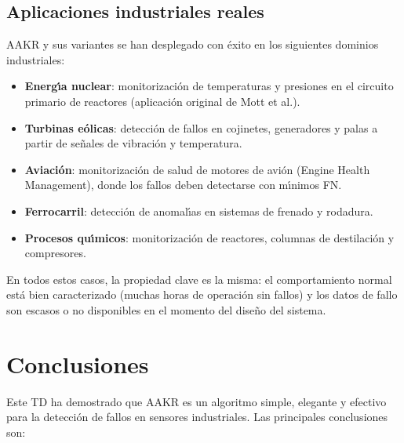 \documentclass[12pt,a4paper]{article}
\begin{document}
\subsection{Aplicaciones industriales reales}

AAKR y sus variantes se han desplegado con \'exito en los siguientes dominios
industriales:

\begin{itemize}[leftmargin=2em]
  \item \textbf{Energ\'{\i}a nuclear}: monitorizaci\'on de temperaturas y presiones en
        el circuito primario de reactores (aplicaci\'on original de Mott et al.).
  \item \textbf{Turbinas e\'olicas}: detecci\'on de fallos en cojinetes, generadores
        y palas a partir de se\~nales de vibraci\'on y temperatura.
  \item \textbf{Aviaci\'on}: monitorizaci\'on de salud de motores de avi\'on (Engine
        Health Management), donde los fallos deben detectarse con m\'{\i}nimos FN.
  \item \textbf{Ferrocarril}: detecci\'on de anomal\'{\i}as en sistemas de frenado y
        rodadura.
  \item \textbf{Procesos qu\'{\i}micos}: monitorizaci\'on de reactores, columnas de
        destilaci\'on y compresores.
\end{itemize}

En todos estos casos, la propiedad clave es la misma: el comportamiento normal est\'a
bien caracterizado (muchas horas de operaci\'on sin fallos) y los datos de fallo son
escasos o no disponibles en el momento del dise\~no del sistema.

\section{Conclusiones}

Este TD ha demostrado que AAKR es un algoritmo simple, elegante y efectivo para
la detecci\'on de fallos en sensores industriales. Las principales conclusiones son:
\end{document}
